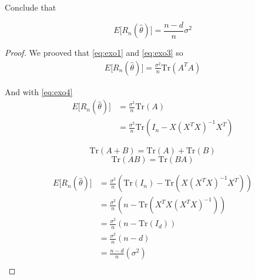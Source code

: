 
Conclude that

\begin{equation}
     E \Big[ R_n (\hat{\theta}) \Big] = \frac{n - d}{n} \sigma^2 
\end{equation}

\begin{proof}
    We prooved that \eqref{eq:exo1} and \eqref{eq:exo3} so
    \begin{align*}
        E \Big[ R_n (\hat{\theta}) \Big] = \frac{\sigma^2}{n} \mathrm {Tr} (A^T A)
    \end{align*}

    And with \eqref{eq:exo4}
    \begin{align*}
        E \Big[ R_n (\hat{\theta}) \Big] &=\frac{\sigma^2}{n}  \mathrm {Tr} (A)\\
            &= \frac{\sigma^2}{n} \mathrm {Tr} (I_n - X (X^T X)^{-1} X^T)
    \end{align*}

    \begin{equation}
        \mathrm {Tr} (A + B) =\mathrm {Tr} (A) + \mathrm {Tr} (B)
    \end{equation}
    \begin{equation}
        \mathrm {Tr} (AB) = \mathrm {Tr} (BA)
    \end{equation}

    \begin{align*}
        E \Big[ R_n (\hat{\theta}) \Big]
            &= \frac{\sigma^2}{n} (\mathrm {Tr} (I_n) - \mathrm {Tr} (X (X^T X)^{-1} X^T))\\
            &= \frac{\sigma^2}{n} (n - \mathrm {Tr} (X^TX (X^T X)^{-1}))\\
            &= \frac{\sigma^2}{n} (n - \mathrm {Tr} (I_d))\\
            &= \frac{\sigma^2}{n} (n - d)\\
            &= \frac{n - d}{n} (\sigma^2)\\
    \end{align*}
\end{proof}
